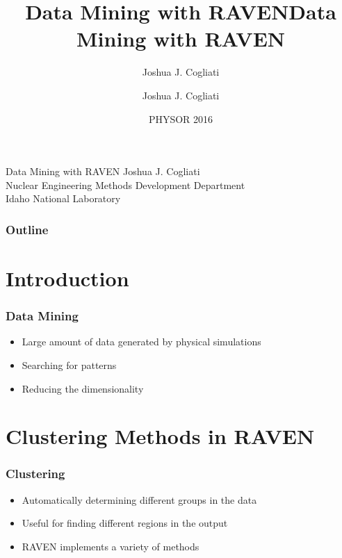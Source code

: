 \documentclass[t,9pt,svgnames]{beamer}
\title{Data Mining with RAVEN}
\author{Joshua J. Cogliati}
\date{PHYSOR 2016}
\begin{document}
\lstset{language=XML}

\title[Data Mining]{Data Mining with RAVEN}
\subtitle{Joshua J. Cogliati}


\begin{titleframe}{Data Mining with RAVEN}
  \vfill
      {\small 
Joshua J. Cogliati\\
Nuclear Engineering Methods Development Department\\
Idaho National Laboratory}
\end{titleframe}

\begin{frame}
\frametitle{Outline}
\tableofcontents
\end{frame}

\section{Introduction}

\begin{frame}
  \frametitle{Data Mining}
  \begin{itemize}
  \item Large amount of data generated by physical simulations
  \item Searching for patterns
  \item Reducing the dimensionality
  \end{itemize}
\end{frame}

\section{Clustering Methods in RAVEN}

\begin{frame}
  \frametitle{Clustering}
  \begin{itemize}
  \item Automatically determining different groups in the data
  \item Useful for finding different regions in the output
  \item RAVEN implements a variety of methods
  \end{itemize}
\end{frame}
\end{document}
